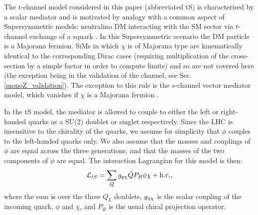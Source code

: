 
The $t$-channel model considered in this paper (abbreviated tS) is characterised by a scalar mediator and is motivated by analogy with a common aspect of Supersymmetric models: neutralino DM interacting with the SM sector via $t$-channel exchange of a squark \cite{SUSYDM}. In this Supersymmetric scenario the DM particle is a Majorana fermion. SiMs in which $\chi$ is of Majorana type are kinematically identical to the corresponding Dirac cases (requiring multiplication of the cross-section by a simple factor in order to compute limits) and so are not covered here (the exception being in the validation of the \monoZ channel, see Sec. \ref{monoZ_validation}). The exception to this rule is the $s$-channel vector mediator model, which vanishes if $\chi$ is a Majorana fermion \cite{METSig}.

In the tS model, the mediator is allowed to couple to either the left or right-handed quarks as a SU(2) doublet or singlet respectively. Since the LHC is insensitive to the chirality of the quarks, we assume for simplicity that $\phi$ couples to the left-handed quarks only. We also assume that the masses and couplings of $\phi$ are equal across the three generations, and that the masses of the two components of $\phi$ are equal. The interaction Lagrangian for this model is then:
\begin{equation}
\label{L_int_tS}
\mathcal{L}_{tS} = \sum_{Q} g_{q \chi} \bar{Q} P_R \phi \chi + {\rm h.c.},
\end{equation}
where the sum is over the three $Q_L$ doublets, $g_{q \chi}$ is the scalar coupling of the incoming quark, $\phi$ and $\chi$, and $P_R$ is the usual chiral projection operator.


